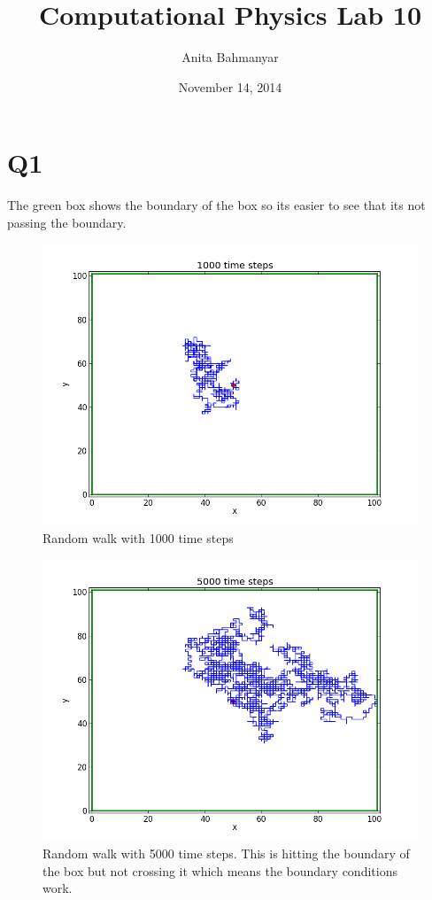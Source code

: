 \documentclass[letterpaper,12pt]{article}
\title{Computational Physics Lab 10}
\author{Anita Bahmanyar}
\affil{\small {Student Number: 998909098}}
\date{November 14, 2014}
\begin{document}
\maketitle

\section*{Q1}
The green box shows the boundary of the box so its easier to see that its not passing the boundary.

\FloatBarrier
\begin{figure}[H]
\centering
\includegraphics[scale=0.55]{q1a.png}
\caption{Random walk with 1000 time steps}
\end{figure}
\FloatBarrier

\FloatBarrier
\begin{figure}[H]
\centering
\includegraphics[scale=0.55]{q1b.png}
\caption{Random walk with 5000 time steps. This is hitting the boundary of the box but not crossing it which means the boundary conditions work.}
\end{figure}
\FloatBarrier
\end{document}
